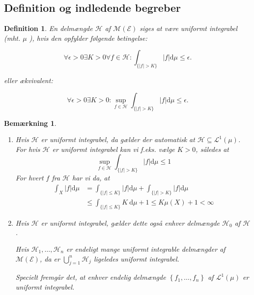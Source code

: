 \documentclass{article}
\newcommand{\1}{\mathbbm{1}}
\newtheorem{definition}[theorem]{Definition}
\newtheorem{remark}[theorem]{Bemærkning}
\theoremstyle{boxed}
\begin{document}
\subsection{Definition og indledende begreber}
\begin{theorem-box}
    \begin{definition}
        En delmængde $\mathcal{H}$ af $\mathcal{M}(\mathcal{E})$ siges at være uniformt integrabel (mht. $\mu$ ), hvis den opfylder følgende betingelse:

$$
\forall \epsilon>0 \exists K>0 \forall f \in \mathcal{H}: \int_{\{|f|>K\}}|f| \mathrm{d} \mu \leq \epsilon .
$$

eller ækvivalent:

$$
\forall \epsilon>0 \exists K>0: \sup _{f \in \mathcal{H}} \int_{\{|f|>K\}}|f| \mathrm{d} \mu \leq \epsilon .
$$

    \end{definition}
\end{theorem-box}
\begin{remark}
    \begin{enumerate}
        \item[\textnormal{(i)}] Hvis $\mathcal{H}$ er uniformt integrabel, da gælder der automatisk at $\mathcal{H} \subseteq \mathcal{L}^1(\mu)$.
        For hvis $\mathcal{H}$ er uniformt integrabel kan vi f.eks. vælge $K>0$, således at
        $$
        \sup _{f \in \mathcal{H}} \int_{\{|f|>K\}}|f| \mathrm{d} \mu \leq 1
        $$
        For hvert $f$ fra $\mathcal{H}$ har vi da, at
        $$
        \begin{aligned}
        \int_X|f| \mathrm{d} \mu & =\int_{\{|f| \leq K\}}|f| \mathrm{d} \mu+\int_{\{|f|>K\}}|f| \mathrm{d} \mu \\
        & \leq \int_{\{|f| \leq K\}} K \mathrm{~d} \mu+1 \leq K \mu(X)+1<\infty
        \end{aligned}
        $$
        \item[\textnormal{(ii)}] Hvis $\mathcal{H}$ er uniformt integrabel, gælder dette også enhver delmængde $\mathcal{H}_0$ af $\mathcal{H}$.

        Hvis $\mathcal{H}_1, \ldots, \mathcal{H}_n$ er endeligt mange uniformt integrable delmængder af $\mathcal{M}(\mathcal{E})$, da er $\bigcup_{j=1}^n \mathcal{H}_j$ ligeledes uniformt integrabel.
        
        Specielt fremgår det, at enhver endelig delmængde $\left\{f_1, \ldots, f_n\right\}$ af $\mathcal{L}^1(\mu)$ er uniformt integrabel.
    \end{enumerate}
\end{remark}
\end{document}
